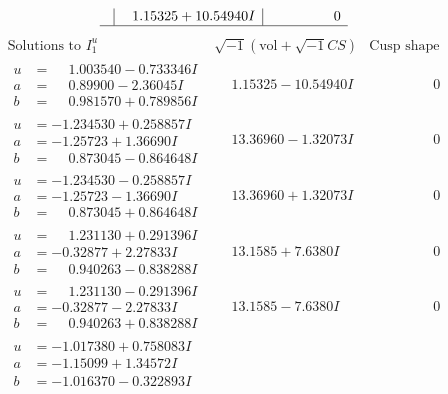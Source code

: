 \documentclass[1p]{elsarticle_modified}
\theoremstyle{definition}
\newcommand{\I}{\sqrt{-1}}
\begin{document}
$$\begin{array}{c|c|c}
 & \phantom{-}1.15325 + 10.54940 I & \phantom{-0.000000 } 0\\
 \hline 
 \end{array}$$\newpage$$\begin{array}{c|c|c}  
\text{Solutions to }I^u_{1}& \I (\text{vol} + \sqrt{-1}CS) & \text{Cusp shape}\\
 \hline 
\begin{aligned}
u &= \phantom{-}1.003540 - 0.733346 I \\
a &= \phantom{-}0.89900 - 2.36045 I \\
b &= \phantom{-}0.981570 + 0.789856 I\end{aligned}
 & \phantom{-}1.15325 - 10.54940 I & \phantom{-0.000000 } 0 \\ \hline\begin{aligned}
u &= -1.234530 + 0.258857 I \\
a &= -1.25723 + 1.36690 I \\
b &= \phantom{-}0.873045 - 0.864648 I\end{aligned}
 & \phantom{-}13.36960 - 1.32073 I & \phantom{-0.000000 } 0 \\ \hline\begin{aligned}
u &= -1.234530 - 0.258857 I \\
a &= -1.25723 - 1.36690 I \\
b &= \phantom{-}0.873045 + 0.864648 I\end{aligned}
 & \phantom{-}13.36960 + 1.32073 I & \phantom{-0.000000 } 0 \\ \hline\begin{aligned}
u &= \phantom{-}1.231130 + 0.291396 I \\
a &= -0.32877 + 2.27833 I \\
b &= \phantom{-}0.940263 - 0.838288 I\end{aligned}
 & \phantom{-}13.1585 + 7.6380 I & \phantom{-0.000000 } 0 \\ \hline\begin{aligned}
u &= \phantom{-}1.231130 - 0.291396 I \\
a &= -0.32877 - 2.27833 I \\
b &= \phantom{-}0.940263 + 0.838288 I\end{aligned}
 & \phantom{-}13.1585 - 7.6380 I & \phantom{-0.000000 } 0 \\ \hline\begin{aligned}
u &= -1.017380 + 0.758083 I \\
a &= -1.15099 + 1.34572 I \\
b &= -1.016370 - 0.322893 I\end{aligned}

\end{array}$$
\end{document}
